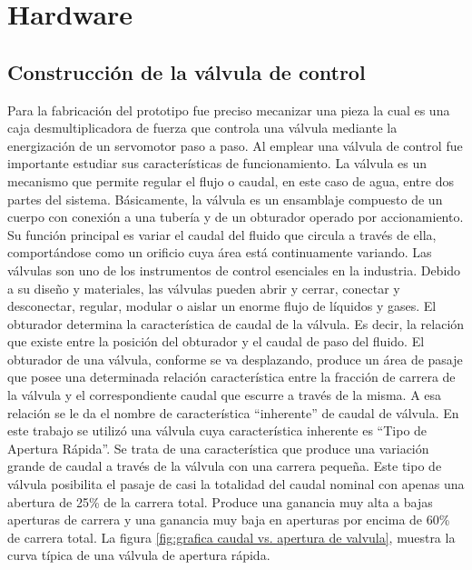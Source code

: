 \section{Hardware}
\subsection{Construcción de la válvula de control}
\label{subsec:Construcción de la válvula de control}

Para la fabricación del prototipo fue preciso mecanizar una pieza la cual es una caja desmultiplicadora de fuerza que controla una válvula mediante la energización de un servomotor paso a paso. 
Al emplear una válvula de control fue importante estudiar sus características de funcionamiento. 
La válvula es un mecanismo que permite regular el flujo  o caudal, en este caso de agua, entre dos partes del sistema. 
Básicamente, la válvula es un ensamblaje compuesto de un cuerpo con conexión a una tubería y de un obturador operado por accionamiento. Su función principal es variar el caudal del fluido que circula a través de ella, comportándose como un orificio cuya área está continuamente variando. Las válvulas son uno de los instrumentos de control esenciales en la industria.
Debido a su diseño y materiales, las válvulas pueden abrir y cerrar, conectar y desconectar, regular, modular o aislar un enorme  flujo de líquidos y gases.
El obturador determina la característica de caudal de la válvula. Es decir, la relación que existe entre la posición del obturador y el caudal de paso del fluido.
El obturador de una válvula, conforme se va desplazando, produce un área de pasaje que posee una determinada relación característica entre la fracción de carrera de la válvula y el correspondiente caudal que escurre a través de la misma. A esa relación se le da el nombre de característica “inherente” de caudal de válvula.
En este trabajo se utilizó una válvula cuya característica inherente es “Tipo de Apertura Rápida”.
Se trata de una característica que produce una variación grande de caudal a través de la válvula con una carrera pequeña. Este tipo de válvula posibilita el pasaje de casi la totalidad del caudal nominal con apenas una abertura de 25\% de la carrera total.
Produce una ganancia muy alta a bajas aperturas de carrera y una ganancia muy baja en aperturas por encima de 60\% de carrera total. 
La figura \ref{fig:grafica caudal vs. apertura de valvula}, muestra la curva típica de una válvula de apertura rápida.
